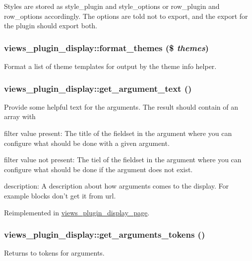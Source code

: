 Styles are stored as style\_\-plugin and style\_\-options or row\_\-plugin and row\_\-options accordingly. The options are told not to export, and the export for the plugin should export both. \hypertarget{classviews__plugin__display_a4f8fbb2ff9dd0f00e31a265334d840e0}{
\subsubsection[{format\_\-themes}]{\setlength{\rightskip}{0pt plus 5cm}views\_\-plugin\_\-display::format\_\-themes (\$ {\em themes})}}
\label{classviews__plugin__display_a4f8fbb2ff9dd0f00e31a265334d840e0}
Format a list of theme templates for output by the theme info helper. \hypertarget{classviews__plugin__display_a3afbeac02cf2d083014cf64c3e66c290}{
\subsubsection[{get\_\-argument\_\-text}]{\setlength{\rightskip}{0pt plus 5cm}views\_\-plugin\_\-display::get\_\-argument\_\-text ()}}
\label{classviews__plugin__display_a3afbeac02cf2d083014cf64c3e66c290}
Provide some helpful text for the arguments. The result should contain of an array with
\begin{DoxyItemize}
\item filter value present: The title of the fieldset in the argument where you can configure what should be done with a given argument.
\item filter value not present: The tiel of the fieldset in the argument where you can configure what should be done if the argument does not exist.
\item description: A description about how arguments comes to the display. For example blocks don't get it from url. 
\end{DoxyItemize}

Reimplemented in \hyperlink{classviews__plugin__display__page_ae3056e57372089c08fb50d85fbfaea49}{views\_\-plugin\_\-display\_\-page}.\hypertarget{classviews__plugin__display_a8e1d0e6c3e44801ae060218c1241c7bc}{
\subsubsection[{get\_\-arguments\_\-tokens}]{\setlength{\rightskip}{0pt plus 5cm}views\_\-plugin\_\-display::get\_\-arguments\_\-tokens ()}}
\label{classviews__plugin__display_a8e1d0e6c3e44801ae060218c1241c7bc}
Returns to tokens for arguments.

